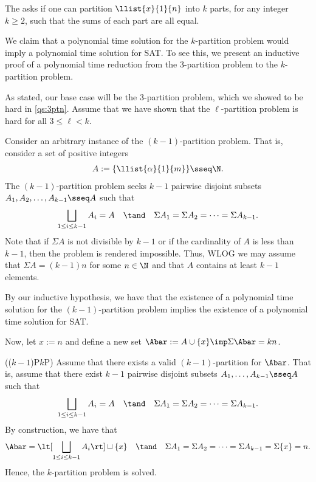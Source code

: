 \documentclass{article}
\begin{document}

\begin{subexercise}
  The  asks if one can partition \( \llist{x}{1}{n} \) into \( k \) parts, for any integer \( k \geq 2 \), such that the sums of each part are all equal.
\end{subexercise}

\begin{solution}
  We claim that a polynomial time solution for the \( k \)-partition problem would imply a polynomial time solution for SAT.
  To see this, we present an inductive proof of a polynomial time reduction from the 3-partition problem to the \( k \)-partition problem.

  As stated, our base case will be the 3-partition problem, which we showed to be hard in \ref{qs:3ptn}.
  Assume that we have shown that the \( \ell \)-partition problem is hard for all \( 3\leq\ell < k \).

  Consider an arbitrary instance of the \( (k-1) \)-partition problem.
  That is, consider a set of positive integers \begin{align*}
    A := \{\llist{\alpha}{1}{m}\} \sseq \N.
  \end{align*}
  The \( (k-1) \)-partition problem seeks \( k-1 \) pairwise disjoint subsets \( A_1,A_2,\ldots,A_{k-1}\sseq A \) such that \begin{align*}
    \bigsqcup_{1\leq i \leq k-1}A_{i} = A \quad \tand \quad \Sigma A_1 = \Sigma A_2 = \cdots = \Sigma A_{k-1}.
  \end{align*}
  Note that if \( \Sigma A \) is not divisible by \( k-1 \) or if the cardinality of \( A \) is less than \( k-1 \), then the problem is rendered impossible.
  Thus, WLOG we may assume that \( \Sigma A = (k-1)n \) for some \( n\in \N \) and that \( A \) contains at least \( k-1 \) elements.

  By our inductive hypothesis, we have that the existence of a polynomial time solution for the \( (k-1) \)-partition problem implies the existence of a polynomial time solution for SAT.

  Now, let \( x := n \) and define a new set \( \Abar := A\cup \{x\}\imp \Sigma \Abar = kn \).

  \begin{subproof}[Correctness.]
    ((\( k-1 \))P\imp \( k \)P)
    Assume that there exists a valid \( (k-1) \)-partition for \( \Abar \).
    That is, assume that there exist \( k-1 \) pairwise disjoint subsets \( A_1,\ldots,A_{k-1}\sseq A \) such that \begin{align*}
      \bigsqcup_{1\leq i \leq k-1}A_{i} = A \quad \tand \quad \Sigma A_1 = \Sigma A_2 = \cdots = \Sigma A_{k-1}.
    \end{align*}
    By construction, we have that \begin{align*}
      \Abar = \lt[\bigsqcup_{1\leq i \leq k-1}A_{i}\rt] \sqcup \{x\} \quad \tand \quad \Sigma A_1 = \Sigma A_2 = \cdots = \Sigma A_{k-1} = \Sigma \{x\} = n.
    \end{align*}
    Hence, the \( k \)-partition problem is solved.


\end{subproof}
\end{solution}
\end{document}
